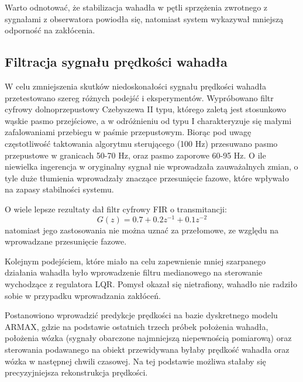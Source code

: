 Warto odnotować, że stabilizacja wahadła w pętli sprzężenia zwrotnego z sygnałami z obserwatora powiodła się, natomiast system wykazywał mniejszą odporność na zakłócenia.  
\subsection{Filtracja sygnału prędkości wahadła}
W celu zmniejszenia skutków niedoskonałości sygnału prędkości wahadła przetestowano szereg różnych podejść i eksperymentów. Wypróbowano filtr cyfrowy dolnoprzepustowy Czebyszewa II typu, którego zaletą jest stosunkowo wąskie pasmo przejściowe, a w odróżnieniu od typu I charakteryzuje się małymi zafalowaniami przebiegu w paśmie przepustowym. Biorąc pod uwagę częstotliwość taktowania algorytmu sterującego (100 Hz) przesuwano pasmo przepustowe w granicach 50-70 Hz, oraz pasmo zaporowe 60-95 Hz. O ile niewielka ingerencja w oryginalny sygnał nie wprowadzała zauważalnych zmian, o tyle duże tłumienia wprowadzały znaczące przesunięcie fazowe, które wpływało na zapasy stabilności systemu.

O wiele lepsze rezultaty dał filtr cyfrowy FIR o transmitancji:
\begin{equation}  
G(z) = 0.7 + 0.2z^{-1} + 0.1z^{-2}
\end{equation} 
natomiast jego zastosowania nie można uznać za przełomowe, ze względu na wprowadzane przesunięcie fazowe.

Kolejnym podejściem, które miało na celu zapewnienie mniej szarpanego działania wahadła było wprowadzenie filtru medianowego na sterowanie wychodzące z regulatora LQR. Pomysł okazał się nietrafiony, wahadło nie radziło sobie w przypadku wprowadzania zakłóceń.

Postanowiono wprowadzić predykcje prędkości na bazie dyskretnego modelu ARMAX, gdzie na podstawie ostatnich trzech próbek położenia wahadła, położenia wózka (sygnały obarczone najmniejszą niepewnością pomiarową) oraz sterowania podawanego na obiekt przewidywana byłaby prędkość wahadła oraz wózka w następnej chwili czasowej. Na tej podstawie możliwa stałaby się precyzyjniejsza rekonstrukcja prędkości. 